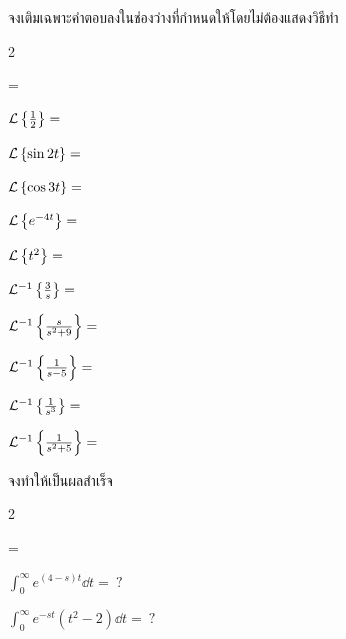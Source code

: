 \documentclass[12pt,final]{novelette} %
\begin{document}
\begin{question}[resume]
    \item {}
    จงเติมเฉพาะคำตอบลงในช่องว่างที่กำหนดให้โดยไม่ต้องแสดงวิธีทำ 
    \begin{multicols}{2}
        \begin{question}
            \everymath={\displaystyle}
            \item
            $\mathcal{L}\left\{\frac12\right\} = \ \dotfill$

            \item
            $\mathcal{L}\left\{\sin 2t\right\} = \ \dotfill$

            \item
            $\mathcal{L}\left\{\cos 3t\right\} = \ \dotfill$

            \item
            $\mathcal{L}\left\{e^{-4t}\right\} = \ \dotfill$

            \item
            $\mathcal{L}\left\{t^2\right\} = \ \dotfill$

            \item
            $\mathcal{L}^{-1}\left\{\frac3s\right\} = \ \dotfill$

            \item
            $\mathcal{L}^{-1}\left\{\frac{s}{s^2+9}\right\} = \ \dotfill$

            \item
            $\mathcal{L}^{-1}\left\{\frac{1}{s-5}\right\} = \ \dotfill$

            \item
            $\mathcal{L}^{-1}\left\{\frac{1}{s^3}\right\} = \ \dotfill$

            \item
            $\mathcal{L}^{-1}\left\{\frac{1}{s^2+5}\right\} = \ \dotfill$
        \end{question}
    \end{multicols}

    \pagebreak

    \item {}
    จงทำให้เป็นผลสำเร็จ 
    \begin{multicols}{2}
        \begin{question}
            \everymath={\displaystyle}
            \item
            $\int_0^\infty e^{(4-s)t} \dd{t} = \ ?$

            \item
            $\int_0^\infty e^{-st} (t^2 - 2) \dd{t} = \ ?$


\end{question}
\end{multicols}
\end{question}
\end{document}
